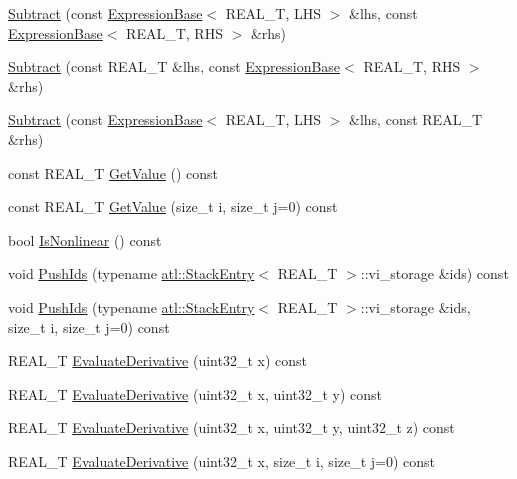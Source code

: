 \begin{DoxyCompactItemize}
\item 
\hyperlink{structatl_1_1_subtract_a5aa723f31391e747b2e0ad15119534a7}{Subtract} (const \hyperlink{structatl_1_1_expression_base}{Expression\+Base}$<$ R\+E\+A\+L\+\_\+\+T, L\+H\+S $>$ \&lhs, const \hyperlink{structatl_1_1_expression_base}{Expression\+Base}$<$ R\+E\+A\+L\+\_\+\+T, R\+H\+S $>$ \&rhs)
\item 
\hyperlink{structatl_1_1_subtract_aec4aa20754729e6982fcf50cc8db62f0}{Subtract} (const R\+E\+A\+L\+\_\+\+T \&lhs, const \hyperlink{structatl_1_1_expression_base}{Expression\+Base}$<$ R\+E\+A\+L\+\_\+\+T, R\+H\+S $>$ \&rhs)
\item 
\hyperlink{structatl_1_1_subtract_a62685c3f4f2009e2d8d5d456b6fadc99}{Subtract} (const \hyperlink{structatl_1_1_expression_base}{Expression\+Base}$<$ R\+E\+A\+L\+\_\+\+T, L\+H\+S $>$ \&lhs, const R\+E\+A\+L\+\_\+\+T \&rhs)
\item 
const R\+E\+A\+L\+\_\+\+T \hyperlink{structatl_1_1_subtract_a80b7e3ae7a1459a1a64f226dbc6007db}{Get\+Value} () const 
\item 
const R\+E\+A\+L\+\_\+\+T \hyperlink{structatl_1_1_subtract_a88c1c9bc7979105b03e33e12e7c68fe1}{Get\+Value} (size\+\_\+t i, size\+\_\+t j=0) const 
\item 
bool \hyperlink{structatl_1_1_subtract_a74f23d9df17503bf6c83b753b5ba3fa1}{Is\+Nonlinear} () const 
\item 
void \hyperlink{structatl_1_1_subtract_a975412a952c1ac7e416b240c1d26e1f7}{Push\+Ids} (typename \hyperlink{structatl_1_1_stack_entry}{atl\+::\+Stack\+Entry}$<$ R\+E\+A\+L\+\_\+\+T $>$\+::vi\+\_\+storage \&ids) const 
\item 
void \hyperlink{structatl_1_1_subtract_aa1e7d93e4b4a9bf0a1f60e9e214b3d3c}{Push\+Ids} (typename \hyperlink{structatl_1_1_stack_entry}{atl\+::\+Stack\+Entry}$<$ R\+E\+A\+L\+\_\+\+T $>$\+::vi\+\_\+storage \&ids, size\+\_\+t i, size\+\_\+t j=0) const 
\item 
R\+E\+A\+L\+\_\+\+T \hyperlink{structatl_1_1_subtract_aeae21f80058270d778c731dda78dabfc}{Evaluate\+Derivative} (uint32\+\_\+t x) const 
\item 
R\+E\+A\+L\+\_\+\+T \hyperlink{structatl_1_1_subtract_adc7933999b1ea0f040b983ad02c8a7b6}{Evaluate\+Derivative} (uint32\+\_\+t x, uint32\+\_\+t y) const 
\item 
R\+E\+A\+L\+\_\+\+T \hyperlink{structatl_1_1_subtract_a1284210aba1ac90b41818eb93be2e097}{Evaluate\+Derivative} (uint32\+\_\+t x, uint32\+\_\+t y, uint32\+\_\+t z) const 
\item 
R\+E\+A\+L\+\_\+\+T \hyperlink{structatl_1_1_subtract_aff679c6ebb81a9c0caf5dc1400cfb718}{Evaluate\+Derivative} (uint32\+\_\+t x, size\+\_\+t i, size\+\_\+t j=0) const 

\end{DoxyCompactItemize}
